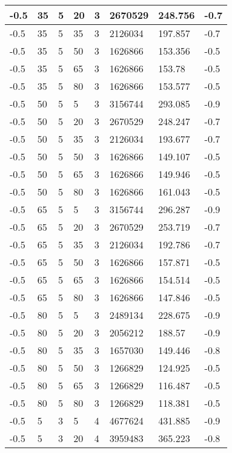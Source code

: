 \begin{longtable}{|p{1.4cm}|p{1.4cm}|p{1.4cm}|p{1.4cm}|p{1.4cm}|p{1.4cm}|p{1.4cm}|p{1.5cm}|}
        -0.5 & 35 & 5 & 20 & 3 & 2670529 & 248.756 & -0.7 \\ \hline
        -0.5 & 35 & 5 & 35 & 3 & 2126034 & 197.857 & -0.7 \\ \hline
        -0.5 & 35 & 5 & 50 & 3 & 1626866 & 153.356 & -0.5 \\ \hline
        -0.5 & 35 & 5 & 65 & 3 & 1626866 & 153.78 & -0.5 \\ \hline
        -0.5 & 35 & 5 & 80 & 3 & 1626866 & 153.577 & -0.5 \\ \hline
        -0.5 & 50 & 5 & 5 & 3 & 3156744 & 293.085 & -0.9 \\ \hline
        -0.5 & 50 & 5 & 20 & 3 & 2670529 & 248.247 & -0.7 \\ \hline
        -0.5 & 50 & 5 & 35 & 3 & 2126034 & 193.677 & -0.7 \\ \hline
        -0.5 & 50 & 5 & 50 & 3 & 1626866 & 149.107 & -0.5 \\ \hline
        -0.5 & 50 & 5 & 65 & 3 & 1626866 & 149.946 & -0.5 \\ \hline
        -0.5 & 50 & 5 & 80 & 3 & 1626866 & 161.043 & -0.5 \\ \hline
        -0.5 & 65 & 5 & 5 & 3 & 3156744 & 296.287 & -0.9 \\ \hline
        -0.5 & 65 & 5 & 20 & 3 & 2670529 & 253.719 & -0.7 \\ \hline
        -0.5 & 65 & 5 & 35 & 3 & 2126034 & 192.786 & -0.7 \\ \hline
        -0.5 & 65 & 5 & 50 & 3 & 1626866 & 157.871 & -0.5 \\ \hline
        -0.5 & 65 & 5 & 65 & 3 & 1626866 & 154.514 & -0.5 \\ \hline
        -0.5 & 65 & 5 & 80 & 3 & 1626866 & 147.846 & -0.5 \\ \hline
        -0.5 & 80 & 5 & 5 & 3 & 2489134 & 228.675 & -0.9 \\ \hline
        -0.5 & 80 & 5 & 20 & 3 & 2056212 & 188.57 & -0.9 \\ \hline
        -0.5 & 80 & 5 & 35 & 3 & 1657030 & 149.446 & -0.8 \\ \hline
        -0.5 & 80 & 5 & 50 & 3 & 1266829 & 124.925 & -0.5 \\ \hline
        -0.5 & 80 & 5 & 65 & 3 & 1266829 & 116.487 & -0.5 \\ \hline
        -0.5 & 80 & 5 & 80 & 3 & 1266829 & 118.381 & -0.5 \\ \hline
        -0.5 & 5 & 3 & 5 & 4 & 4677624 & 431.885 & -0.9 \\ \hline
        -0.5 & 5 & 3 & 20 & 4 & 3959483 & 365.223 & -0.8 \\ \hline

\end{longtable}
